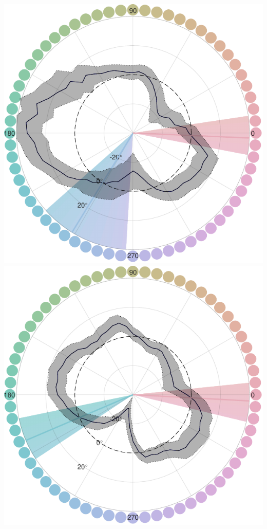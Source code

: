 \begin{minipage}{\textwidth}
\includegraphics[width=0.49\linewidth]{../../../Outputs/Paper/Figures/working/7_IndiData_MixMod/210428--210609_Buster_categorybias2_230225.pdf}
\label{fig:BiasCurvesBuster}
\hfill
\includegraphics[width=0.49\linewidth]{../../../Outputs/Paper/Figures/working/7_IndiData_MixMod/220322--220823_Morty_categorybias2_230225.pdf}
\label{fig:BiasCurvesMorty}

\label{fig:BiasCurvesIndividual}
\end{minipage}


\begin{minipage}{\textwidth}


\label{fig:SimilarityMatrixPollux}
\hfill
    
\label{fig:SimilarityMatrixCastor}

    
\label{fig:SimilarityMatrixBuster}
\hfill
    
\label{fig:SimilarityMatrixMorty}

\label{fig:SimilarityMatrixIndividual}
\end{minipage}

